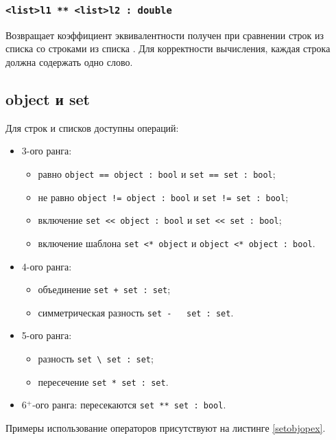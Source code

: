 \documentclass[a4paper, 14pt]{extarticle}
\newenvironment{icItems}
	{ \begin{itemize} [noitemsep,nolistsep] }
	{ \end{itemize} }
\begin{document}
\subsubsection{\lstinline`<list>l1 ** <list>l2 : double`}

Возвращает коэффициент эквивалентности получен при сравнении строк из списка  со строками из списка .
Для корректности вычисления, каждая строка должна содержать одно слово.

\subsection{{\color{lightblue}object} и {\color{lightblue}set}}

Для строк и списков доступны операций:
\begin{icItems}
	\item
		3-ого ранга:
		\begin{icItems}
		\item
			равно \lstinline`object == object : bool` и \lstinline`set == set : bool`;
		\item
			не равно \lstinline`object != object : bool` и \lstinline`set != set : bool`;
		\item
			включение \lstinline`set << object : bool` и \lstinline|set << set : bool|;
		\item
			включение шаблона \lstinline`set <* object` и \lstinline`object <* object : bool`.
		\end{icItems}
	\item
		4-ого ранга:
		\begin{icItems}
		\item
			объединение \lstinline`set + set : set`;
		\item
			симметрическая разность \lstinline`set -   set : set`.
		\end{icItems}
	\item
		5-ого ранга:
		\begin{icItems}
		\item
			разность \lstinline`set \ set : set`;
		\item
			пересечение \lstinline`set * set : set`.
		\end{icItems}
	\item
		6$^+$-ого ранга: пересекаются \lstinline|set ** set : bool|.
\end{icItems}

Примеры использование операторов присутствуют на листинге \ref{setobjopex}.
\end{document}

